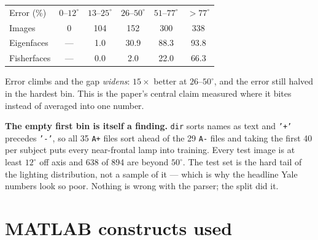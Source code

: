 \documentclass[11pt]{article}
\begin{document}
\begin{center}
\begin{tabular}{lccccc}\toprule
Error (\%) & $0$--$12^\circ$ & $13$--$25^\circ$ & $26$--$50^\circ$ & $51$--$77^\circ$ & $>77^\circ$\\
Images & 0 & 104 & 152 & 300 & 338\\\midrule
Eigenfaces & --- & 1.0 & 30.9 & 88.3 & 93.8\\
Fisherfaces & --- & 0.0 & 2.0 & 22.0 & 66.3\\\bottomrule
\end{tabular}
\end{center}

Error climbs and the gap \emph{widens}: $15\times$ better at $26$--$50^\circ$,
and the error still halved in the hardest bin. This is the paper's central
claim measured where it bites instead of averaged into one number.

\textbf{The empty first bin is itself a finding.} \texttt{dir} sorts names as
text and \texttt{'+'} precedes \texttt{'-'}, so all 35 \texttt{A+} files sort
ahead of the 29 \texttt{A-} files and taking the first 40 per subject puts every
near-frontal lamp into training. Every test image is at least $12^\circ$ off
axis and 638 of 894 are beyond $50^\circ$. The test set is the hard tail of the
lighting distribution, not a sample of it --- which is why the headline Yale
numbers look so poor. Nothing is wrong with the parser; the split did it.

\section{MATLAB constructs used}
\end{document}
